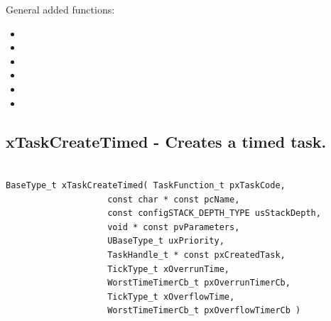 \noindent General added functions:
\begin{itemize}

    \item {}
    \item {}
    \item {}
    \item {}
    \item {}
    \item {}
    
\end{itemize}

\subsection{xTaskCreateTimed -  Creates a timed task.}
\label{rt_cmd:xTaskCreateTimed}

\begin{verbatim}

BaseType_t xTaskCreateTimed( TaskFunction_t pxTaskCode,
                    const char * const pcName,
                    const configSTACK_DEPTH_TYPE usStackDepth,
                    void * const pvParameters,
                    UBaseType_t uxPriority,
                    TaskHandle_t * const pxCreatedTask,
                    TickType_t xOverrunTime,
                    WorstTimeTimerCb_t pxOverrunTimerCb,
                    TickType_t xOverflowTime,
                    WorstTimeTimerCb_t pxOverflowTimerCb )
            
\end{verbatim}

